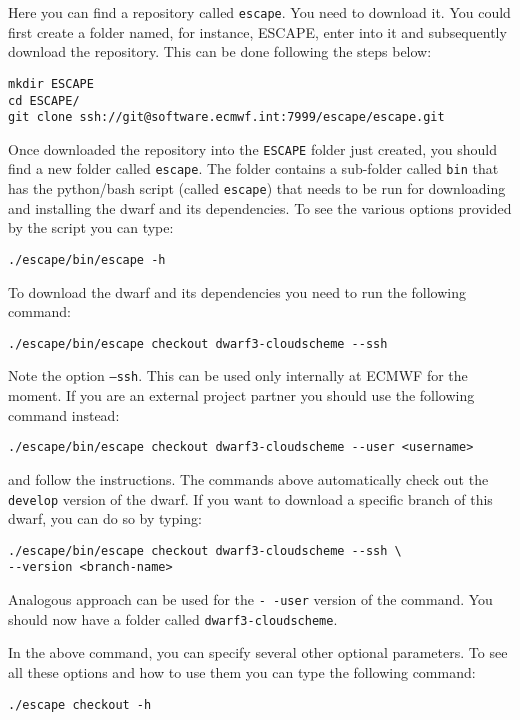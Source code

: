 \documentclass[
a4paper,     %
12pt,        %
article,
onecolumn,   %
openany,     %
]{memoir}
\newcommand{\inlsh}[1]{\texttt{#1}}
\newcommand{\inlsh}[1]{\tikz[anchor=base,baseline]\node[inner sep=2pt,
outer sep=0,draw=yellow!10,fill=yellow!10]{\texttt{#1}};}
\begin{document}
Here you can find a repository called \inlsh{escape}.
You need to download it. You could first create a 
folder named, for instance, ESCAPE, enter into it 
and subsequently download the repository. 
This can be done following the steps below:
%
\begin{lstlisting}[style=BashStyle]
mkdir ESCAPE
cd ESCAPE/
git clone ssh://git@software.ecmwf.int:7999/escape/escape.git
\end{lstlisting}
%
Once downloaded the repository into the \inlsh{ESCAPE} folder 
just created, you should find a new folder called \inlsh{escape}. 
The folder contains a sub-folder called \inlsh{bin} that has the 
python/bash script (called \inlsh{escape}) that needs to be 
run for downloading and installing the dwarf and its dependencies. 
To see the various options provided by the script you can type:
%
\begin{lstlisting}[style=BashStyle]
./escape/bin/escape -h
\end{lstlisting}
%
To download the dwarf and its dependencies you need to run 
the following command:
%
\begin{lstlisting}[style=BashStyle]
./escape/bin/escape checkout dwarf3-cloudscheme --ssh
\end{lstlisting}
% 
Note the option \inlsh{--ssh}. This can be used only internally 
at ECMWF for the moment. If you are an external project partner
you should use the following command instead:
%
\begin{lstlisting}[style=BashStyle]
./escape/bin/escape checkout dwarf3-cloudscheme --user <username>
\end{lstlisting}
% 
and follow the instructions. 
The commands above automatically check out the \inlsh{develop}
version of the dwarf. If you want to download a specific branch 
of this dwarf, you can do so by typing:
%
\begin{lstlisting}[style=BashStyle]
./escape/bin/escape checkout dwarf3-cloudscheme --ssh \
--version <branch-name>
\end{lstlisting}
% 
Analogous approach can be used for the \inlsh{-\,-user} 
version of the command. You should now have a folder called 
\inlsh{dwarf3-cloudscheme}.

In the above command, you can specify several other optional 
parameters. To see all these options and how to use them you 
can type the following command:
%
\begin{lstlisting}[style=BashStyle]
./escape checkout -h
\end{lstlisting}
%
\end{document}
